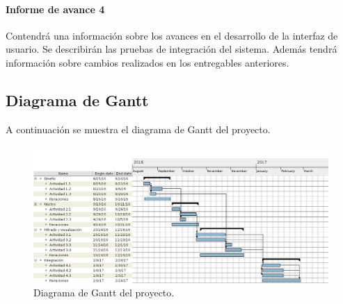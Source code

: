 \paragraph{Informe de avance 4}
Contendrá una información sobre los avances en el desarrollo de la interfaz de usuario. Se describirán las pruebas de integración del sistema. Además tendrá información sobre cambios realizados en los entregables anteriores.

\newpage

\subsection*{Diagrama de Gantt}

A continuación se muestra el diagrama de Gantt del proyecto.

\begin{figure}[htbp!]
	\includegraphics[scale=.4]{gantt_png}
	\caption{Diagrama de Gantt del proyecto.}
	\label{fig:gantt}
\end{figure}